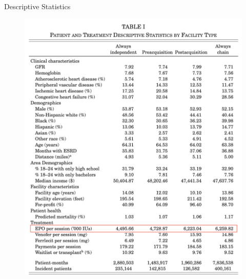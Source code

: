 \begin{frame}{Descriptive Statistics}
    \begin{figure}
        \centering
        \includegraphics[width=0.5\linewidth]{tb1.png}
    \end{figure}
    
\end{frame}